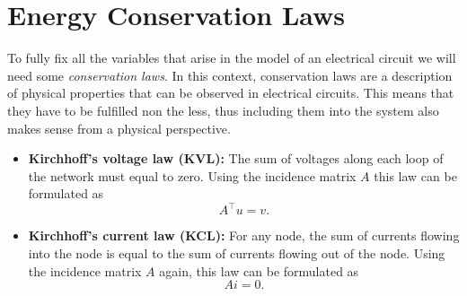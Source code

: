 \section{Energy Conservation Laws}
To fully fix all the variables that arise in the model of an electrical circuit we will need some \emph{conservation laws}. In this context, conservation laws are a description of physical properties that can be observed in electrical circuits. This means that they have to be fulfilled non the less, thus including them into the system also makes sense from a physical perspective. 
\begin{itemize}
	\item \textbf{Kirchhoff's voltage law (KVL):} \newline
	The sum of voltages along each loop of the network must equal to zero. Using the incidence matrix $A$ this law can be formulated as
	\begin{equation}
		\label{KVL}
		A^\top  u = v.
	\end{equation}
	\item \textbf{Kirchhoff's current law (KCL):} \newline
	For any node, the sum of currents flowing into the node is equal to the sum of currents flowing out of the node. Using the incidence matrix $A$ again, this law can be formulated as
	\begin{equation}
		\label{KCL}
		A  i = 0.
	\end{equation}
\end{itemize}

